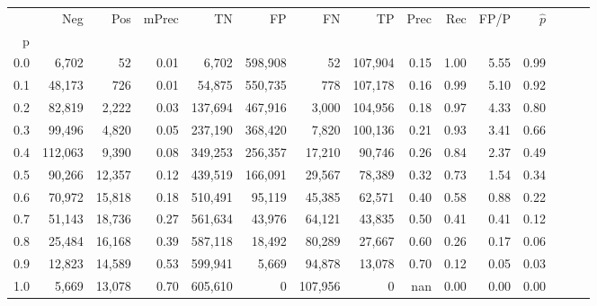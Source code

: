 \begin{tabular}{rrrrrrrrrrrrrrr}
\toprule
{} &      Neg &     Pos & mPrec &       TN &       FP &       FN &       TP &  Prec &   Rec &  FP/P & $\hat{p}$ \\
p   &          &         &       &          &          &          &          &       &       &       &           \\
\midrule
0.0 &    6,702 &      52 &  0.01 &    6,702 &  598,908 &       52 &  107,904 &  0.15 &  1.00 &  5.55 &      0.99 \\
0.1 &   48,173 &     726 &  0.01 &   54,875 &  550,735 &      778 &  107,178 &  0.16 &  0.99 &  5.10 &      0.92 \\
0.2 &   82,819 &   2,222 &  0.03 &  137,694 &  467,916 &    3,000 &  104,956 &  0.18 &  0.97 &  4.33 &      0.80 \\
0.3 &   99,496 &   4,820 &  0.05 &  237,190 &  368,420 &    7,820 &  100,136 &  0.21 &  0.93 &  3.41 &      0.66 \\
0.4 &  112,063 &   9,390 &  0.08 &  349,253 &  256,357 &   17,210 &   90,746 &  0.26 &  0.84 &  2.37 &      0.49 \\
0.5 &   90,266 &  12,357 &  0.12 &  439,519 &  166,091 &   29,567 &   78,389 &  0.32 &  0.73 &  1.54 &      0.34 \\
0.6 &   70,972 &  15,818 &  0.18 &  510,491 &   95,119 &   45,385 &   62,571 &  0.40 &  0.58 &  0.88 &      0.22 \\
0.7 &   51,143 &  18,736 &  0.27 &  561,634 &   43,976 &   64,121 &   43,835 &  0.50 &  0.41 &  0.41 &      0.12 \\
0.8 &   25,484 &  16,168 &  0.39 &  587,118 &   18,492 &   80,289 &   27,667 &  0.60 &  0.26 &  0.17 &      0.06 \\
0.9 &   12,823 &  14,589 &  0.53 &  599,941 &    5,669 &   94,878 &   13,078 &  0.70 &  0.12 &  0.05 &      0.03 \\
1.0 &    5,669 &  13,078 &  0.70 &  605,610 &        0 &  107,956 &        0 &   nan &  0.00 &  0.00 &      0.00 \\
\bottomrule
\end{tabular}
